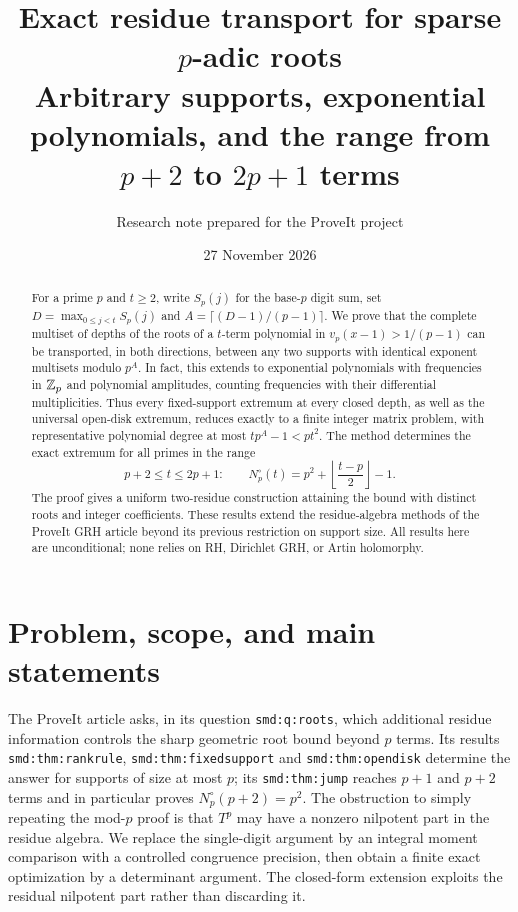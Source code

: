 \documentclass[11pt]{article}
\title{Exact residue transport for sparse $p$-adic roots\\[3pt]\large Arbitrary supports, exponential polynomials, and the range from $p+2$ to $2p+1$ terms}
\author{Research note prepared for the ProveIt project}
\date{27 November 2026}
\theoremstyle{remark}\newtheorem{remark}[theorem]{Remark}
\begin{document}
\maketitle
\begin{abstract}
For a prime $p$ and $t\ge2$, write $S_p(j)$ for the base-$p$ digit sum, set
$D=\max_{0\le j<t}S_p(j)$ and $A=\lceil(D-1)/(p-1)\rceil$.
We prove that the complete multiset of depths of the roots of a $t$-term polynomial in
$v_p(x-1)>1/(p-1)$ can be transported, in both directions, between any two supports with
identical exponent multisets modulo $p^A$. In fact, this extends to exponential
polynomials with frequencies in $\mathbb Z_p$ and polynomial amplitudes, counting frequencies
with their differential multiplicities. Thus every fixed-support extremum at every
closed depth, as well as the universal open-disk extremum, reduces exactly to a finite
integer matrix problem, with representative polynomial degree at most $tp^A-1<pt^2$.
The method determines the exact extremum for all primes in the range
\[
 p+2\le t\le 2p+1:\qquad N_p^\circ(t)=p^2+\left\lfloor\frac{t-p}{2}\right\rfloor-1.
\]
The proof gives a uniform two-residue construction attaining the bound with distinct
roots and integer coefficients. These results extend the residue-algebra methods of the
ProveIt GRH article beyond its previous restriction on support size. All results here
are unconditional; none relies on RH, Dirichlet GRH, or Artin holomorphy.
\end{abstract}

\section{Problem, scope, and main statements}

The ProveIt article \cite{article} asks, in its question \texttt{smd:q:roots}, which additional
residue information controls the sharp geometric root bound beyond $p$ terms. Its
results \texttt{smd:thm:rankrule}, \texttt{smd:thm:fixedsupport} and
\texttt{smd:thm:opendisk} determine the answer for supports of size at most $p$; its
\texttt{smd:thm:jump} reaches $p+1$ and $p+2$ terms and in particular proves
$N_p^\circ(p+2)=p^2$. The obstruction to simply repeating the mod-$p$ proof is that
$T^p$ may have a nonzero nilpotent part in the residue algebra. We replace the
single-digit argument by an integral moment comparison with a controlled congruence
precision, then obtain a finite exact optimization by a determinant argument. The
closed-form extension exploits the residual nilpotent part rather than discarding it.
\end{document}
